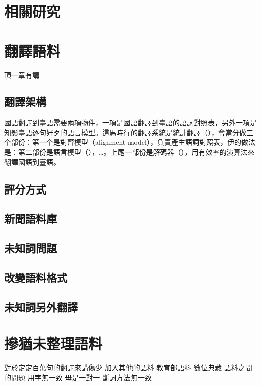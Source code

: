 \documentclass[final,oneside,onecolumn,12pt,a4paper]{book}%
\begin{document}
\chapter{相關研究}
\label{章：相關研究}


\chapter{翻譯語料}
\label{章：翻譯語料}

頂一章有講

\section{翻譯架構}
\label{節：翻譯架構}
國語翻譯到臺語需要兩項物件，一項是國語翻譯到臺語的語詞對照表，另外一項是知影臺語逐句好歹的語言模型。這馬時行的翻譯系統是統計翻譯（），會當分做三个部份：第一个是對齊模型（alignment model），負責產生語詞對照表，伊的做法是：第二部份是語言模型（），…。上尾一部份是解碼器（），用有效率的演算法來翻譯國語到臺語。
\section{評分方式}
\label{節：評分方式}

\section{新聞語料庫}
\label{節：新聞語料庫}

\section{未知詞問題}
\label{節：未知詞問題}

\section{改變語料格式}
\label{節：改變語料格式}

\section{未知詞另外翻譯}
\label{節：未知詞另外翻譯}

\chapter{摻猶未整理語料}
\label{章：摻猶未整理語料}
對於定定百萬句的翻譯來講傷少
加入其他的語料
教育部語料
數位典藏
 語料之間的問題
用字無一致
毋是一對一
斷詞方法無一致
\end{document}
